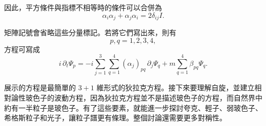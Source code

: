 因此，平方條件與指標不相等時的條件可以合併為
\begin{equation}
\alpha_i\alpha_j+\alpha_j\alpha_i=2\delta_{ij}I.
\end{equation}

\begin{classroomqa}
\end{classroomqa}

\begin{classroomqa}
\end{classroomqa}

\begin{classroomqa}
\end{classroomqa}

矩陣記號會省略這些分量標記。若將它們寫出來，則有
\begin{equation}
p,q=1,2,3,4,
\end{equation}
方程可寫成
\begin{equation}
i\,\partial_t\Psi_p
=
-i\sum_{j=1}^{3}\sum_{q=1}^{4}
(\alpha_j)_{pq}\,\partial_j\Psi_q
+m\sum_{q=1}^{4}\beta_{pq}\Psi_q.
\end{equation}

\begin{classroomqa}
\end{classroomqa}

展示的方程是最簡單的 \(3+1\) 維形式的狄拉克方程。接下來要理解自旋，並建立相對論性玻色子的波動方程，因為狄拉克方程並不是描述玻色子的方程，而自然界中約有一半粒子是玻色子。有了這些要素，就能進一步探討夸克、輕子、弱玻色子、希格斯粒子和光子，讓粒子譜更有條理。整個討論還需要更多對稱性。